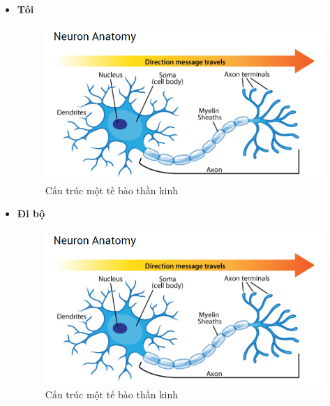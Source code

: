 \documentclass[12pt,a4paper,oneside]{book}
\numberwithin{equation}{chapter} %
\numberwithin{figure}{chapter} %
\numberwithin{table}{chapter} %
\begin{document}
\begin{itemize}
\item \textbf{Tôi}

\FloatBarrier
\begin{figure}[htp]
\begin{center}
\includegraphics[scale=0.8]{chap2/c2_figs/neuron.png}
\end{center}
\caption{Cấu trúc một tế bào thần kinh}
\label{fig:neuronsinhhoc}
\end{figure}
\FloatBarrier

\item \textbf{Đi bộ}

\begin{figure}[htp]
\begin{center}
\includegraphics[scale=0.8]{chap2/c2_figs/neuron.png}
\end{center}
\caption{Cấu trúc một tế bào thần kinh}
\label{fig:neuronsinhhoc}
\end{figure}



\end{itemize}
\end{document}
